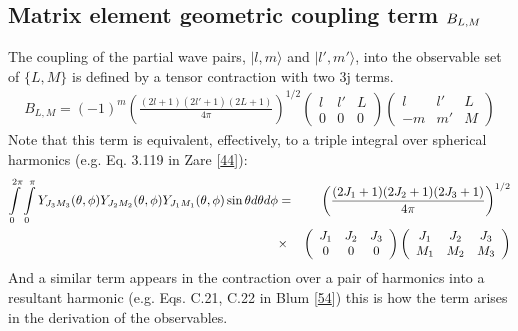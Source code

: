 \documentclass[letterpaper,table,10pt,english]{jupyterBook}
\begin{document}
\subsection{Matrix element geometric coupling term \protect\(B_{L,M}\protect\)}
\label{\detokenize{part1/theory_tensor_formalism_201122:matrix-element-geometric-coupling-term-b-l-m}}\label{\detokenize{part1/theory_tensor_formalism_201122:sec-theory-blm-term}}
\sphinxAtStartPar
The coupling of the partial wave pairs, \(|l,m\rangle\) and \(|l',m'\rangle\), into the observable set of \(\{L,M\}\) is defined by a tensor contraction with two 3j terms.
\begin{equation}\label{equation:part1/theory_tensor_formalism_201122:eq:basis-BLM-defn}
\begin{split}
B_{L,M}=(-1)^{m}\left(\frac{(2l+1)(2l'+1)(2L+1)}{4\pi}\right)^{1/2}\left(\begin{array}{ccc}
l & l' & L\\
0 & 0 & 0
\end{array}\right)\left(\begin{array}{ccc}
l & l' & L\\
-m & m' & M
\end{array}\right)
\end{split}
\end{equation}
\sphinxAtStartPar
Note that this term is equivalent, effectively, to a triple integral over spherical harmonics (e.g. Eq. 3.119 in Zare {[}\hyperlink{cite.backmatter/bibliography:id882}{44}{]}):
\begin{equation*}
\begin{split}
\begin{aligned}
\intop_{0}^{2\pi}\intop_{0}^{\pi}Y_{J_{3}M_{3}}(\theta,\phi)Y_{J_{2}M_{2}}(\theta,\phi)Y_{J_{1}M_{1}}(\theta,\phi)\sin\theta d\theta d\phi & = & \left(\frac{(2J_{1}+1)(2J_{2}+1)(2J_{3}+1)}{4\pi}\right)^{1/2}\\
 & \times & \left(\begin{array}{ccc}
J_{1} & J_{2} & J_{3}\\
0 & 0 & 0
\end{array}\right)\left(\begin{array}{ccc}
J_{1} & J_{2} & J_{3}\\
M_{1} & M_{2} & M_{3}
\end{array}\right)
\end{aligned}
\end{split}
\end{equation*}
\sphinxAtStartPar
And a similar term appears in the contraction over a pair of harmonics into a resultant harmonic (e.g. Eqs. C.21, C.22 in Blum {[}\hyperlink{cite.backmatter/bibliography:id479}{54}{]}) \sphinxhyphen{} this is how the term arises in the derivation of the observables.
\end{document}
